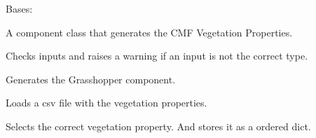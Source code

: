 \documentclass[letterpaper,10pt,english]{sphinxmanual}
\begin{document}
\begin{fulllineitems}
\label{\detokenize{cmf:livestock.components.comp_cmf.CMFVegetationProperties}}
Bases: {\hyperref[\detokenize{superclass:livestock.components.component.GHComponent}]{}}

A component class that generates the CMF Vegetation Properties.

\begin{fulllineitems}
\label{\detokenize{cmf:livestock.components.comp_cmf.CMFVegetationProperties.check_inputs}}
Checks inputs and raises a warning if an input is not the correct type.

\end{fulllineitems}


\begin{fulllineitems}
\label{\detokenize{cmf:livestock.components.comp_cmf.CMFVegetationProperties.config}}
Generates the Grasshopper component.

\end{fulllineitems}


\begin{fulllineitems}
\label{\detokenize{cmf:livestock.components.comp_cmf.CMFVegetationProperties.load_csv}}
Loads a csv file with the vegetation properties.

\end{fulllineitems}


\begin{fulllineitems}
\label{\detokenize{cmf:livestock.components.comp_cmf.CMFVegetationProperties.pick_property}}
Selects the correct vegetation property. And stores it as a ordered dict.


\end{fulllineitems}
\end{fulllineitems}
\end{document}
